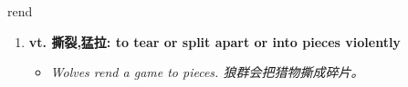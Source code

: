 
\begin{frame}
{\huge rend}
\begin{center}
\begin{enumerate}\Large
  \item \textbf{vt. 撕裂,猛拉: to tear or split apart or into pieces violently}
  \begin{itemize}
    \item \em{\Large{Wolves rend a game to pieces. 狼群会把猎物撕成碎片。}}
  \end{itemize}
\end{enumerate}
\end{center}
\end{frame}
